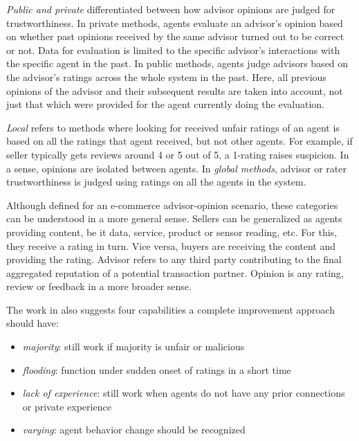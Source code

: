 \documentclass[%
    ]{\PathToTumTemplate/thesis/tum_thesis}
\begin{document}
\emph{Public and private} differentiated between how advisor opinions are judged for trustworthiness.
In private methods, agents evaluate an advisor's opinion based on whether past opinions received by the same advisor turned out to be correct or not.
Data for evaluation is limited to the specific advisor's interactions with the specific agent in the past.
In public methods, agents judge advisors based on the advisor's ratings across the whole system in the past.
Here, all previous opinions of the advisor and their subsequent results are taken into account, not just that which were provided for the agent currently doing the evaluation.

\emph{Local} refers to methods where looking for received unfair ratings of an agent is based on all the ratings that agent received, but not other agents.
For example, if seller typically gets reviews around 4 or 5 out of 5, a 1-rating raises suspicion.
In a sense, opinions are isolated between agents.
In \emph{global methods}, advisor or rater trustworthiness is judged using ratings on all the agents in the system.

Although defined for an e-commerce advisor-opinion scenario, these categories can be understood in a more general sense.
Sellers can be generalized as agents providing content, be it data, service, product or sensor reading, etc.
For this, they receive a rating in turn.
Vice versa, buyers are receiving the content and providing the rating.
Advisor refers to any third party contributing to the final aggregated reputation of a potential transaction partner.
Opinion is any rating, review or feedback in a more broader sense.


The work in \cite{zhang_detailed_2008} also suggests four capabilities a complete improvement approach should have:
\begin{itemize}
\item \emph{majority}: still work if majority is unfair or malicious
\item \emph{flooding}: function under sudden onset of ratings in a short time
\item \emph{lack of experience}: still work when agents do not have any prior connections or private experience
\item \emph{varying}: agent behavior change should be recognized
\end{itemize}
\end{document}
